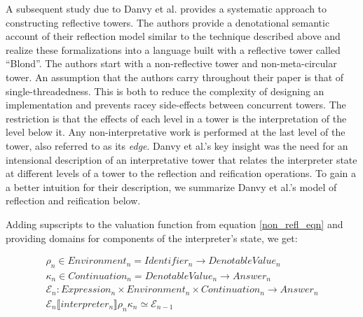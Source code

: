 \documentclass{article}
\theoremstyle{definition}
\begin{document}

A subsequent study due to Danvy et al. \cite{danvy1988intensions} provides a systematic approach to constructing reflective towers. The authors provide a denotational semantic account of their reflection model similar to the technique described above and realize these formalizations into a language built with a reflective tower called ``Blond''. The authors start with a non-reflective tower and non-meta-circular tower. An assumption that the authors carry throughout their paper is that of single-threadedness. This is both to reduce the complexity of designing an implementation and prevents racey side-effects between concurrent towers. The restriction is that the effects of each level in a tower is the interpretation of the level below it. Any non-interpretative work is performed at the last level of the tower, also referred to as its \textit{edge}. Danvy et al.'s key insight was the need for an intensional description of an interpretative tower that relates the interpreter state at different levels of a tower to the reflection and reification operations. To gain a a better intuition for their description, we summarize Danvy et al.'s model of reflection and reification below.

Adding supscripts to the valuation function from equation \ref{non_refl_eqn} and providing domains for components of the interpreter's state, we get:

\begin{gather}
	\rho_n \in Environment_n = Identifier_n \rightarrow DenotableValue_n \label{denot_non_refl_tower} \\
	\kappa_n \in Continuation_n = DenotableValue_n \rightarrow Answer_n \\
	\mathcal{E}_n: Expression_n \times Environment_n \times Continuation_n \rightarrow Answer_n \\
	\mathcal{E}_n \llbracket interpreter_n \rrbracket \rho_n \kappa_n \simeq \mathcal{E}_{n-1} \label{valuation_fn_non_refl}
\end{gather}
\end{document}
